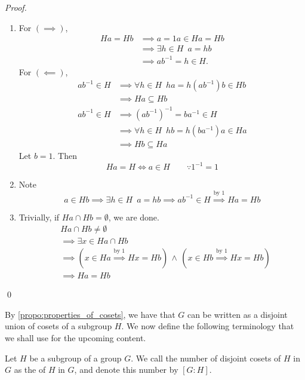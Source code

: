 \begin{proof}
  \begin{enumerate}
    \item For $(\implies)$,
      \begin{align*}
        Ha = Hb &\implies a = 1a \in Ha = Hb \\
                &\implies \exists h \in H \enspace a = hb \\
                &\implies ab^{-1} = h \in H.
      \end{align*}
      For $(\impliedby)$,
      \begin{align*}
        ab^{-1} \in H &\implies \forall h \in H \enspace ha = h(ab^{-1})b \in Hb \\
            &\implies Ha \subseteq Hb \\
        ab^{-1} \in H &\implies (ab^{-1})^{-1} = ba^{-1} \in H \\
            &\implies \forall h \in H \enspace hb = h(ba^{-1})a \in Ha \\
            &\implies Hb \subseteq Ha
      \end{align*}
      Let $b = 1$. Then
      \begin{equation*}
        Ha = H \iff a \in H \qquad \because 1^{-1} = 1
      \end{equation*}

    \item Note
      \begin{equation*}
        a \in Hb \implies \exists h \in H \enspace a = hb \implies ab^{-1} \in H \overset{\text{by 1}}{\implies} Ha = Hb
      \end{equation*}

    \item Trivially, if $Ha \cap Hb = \emptyset$, we are done.
      \begin{align*}
        &Ha \cap Hb \neq \emptyset \\ 
        &\implies \exists x \in Ha \cap Hb \\
        &\implies ( x \in Ha \overset{\text{by 1}}{\implies} Hx = Hb ) \, \land \, ( x \in Hb \overset{\text{by 1}}{\implies} Hx = Hb ) \\
        &\implies Ha = Hb
      \end{align*}
  \end{enumerate}\qed
\end{proof}

By \cref{propo:properties_of_cosets}, we have that $G$ can be written as a disjoint union of cosets of a subgroup $H$. We now define the following terminology that we shall use for the upcoming content.

\begin{defn}[Index]
\label{defn:index}
  Let $H$ be a subgroup of a group $G$. We call the number of disjoint cosets of $H$ in $G$ as the  of $H$ in $G$, and denote this number by $[G : H]$.
\end{defn}



